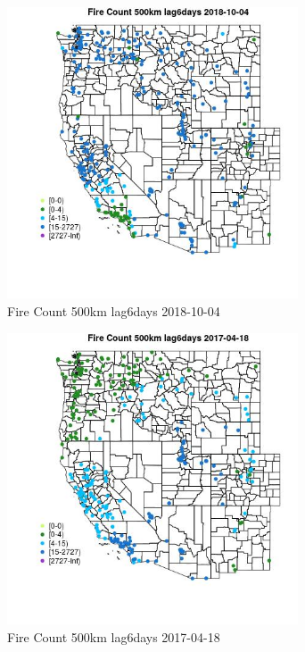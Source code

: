 \begin{figure} 
\centering  
\includegraphics[width=0.77\textwidth]{Code_Outputs/Report_ML_input_PM25_Step4_part_f_de_duplicated_aves_prioritize_24hr_obswNAs_MapObsFire_Count_500km_lag6days2018-10-04.jpg} 
\caption{\label{fig:Report_ML_input_PM25_Step4_part_f_de_duplicated_aves_prioritize_24hr_obswNAsMapObsFire_Count_500km_lag6days2018-10-04}Fire Count 500km lag6days 2018-10-04} 
\end{figure} 
 

\begin{figure} 
\centering  
\includegraphics[width=0.77\textwidth]{Code_Outputs/Report_ML_input_PM25_Step4_part_f_de_duplicated_aves_prioritize_24hr_obswNAs_MapObsFire_Count_500km_lag6days2017-04-18.jpg} 
\caption{\label{fig:Report_ML_input_PM25_Step4_part_f_de_duplicated_aves_prioritize_24hr_obswNAsMapObsFire_Count_500km_lag6days2017-04-18}Fire Count 500km lag6days 2017-04-18} 
\end{figure} 
 

